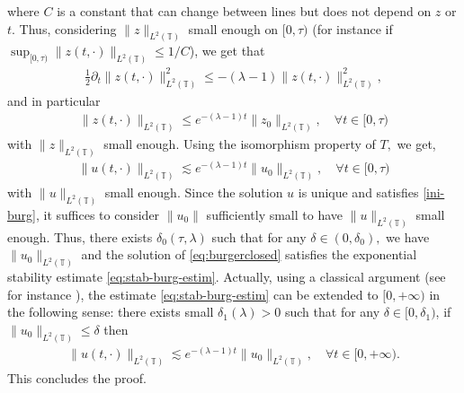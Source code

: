 \documentclass[11pt, dvipsnames]{amsart}
\begin{document}
where $C$ is a constant that can change between lines but does not depend on $z$ or $t$.
Thus, considering $\|z\|_{L^2(\mathbb{T})}$ small enough on $[0,\tau)$ (for instance if $\sup_{[0,\tau)}\|z(t,\cdot)\|_{L^2(\mathbb{T})}\leq 1/C$), we get that
\begin{align*}
 \frac{1}{2}\partial_t \|z(t,\cdot)\|^2_{L^2(\mathbb{T})} \leq -(\lambda-1)\|z(t,\cdot)\|^2_{L^2(\mathbb{T})}, 
\end{align*} and in particular
\begin{align*}
    \|z(t,\cdot)\|_{L^2(\mathbb{T})} \leq e^{-(\lambda-1)t}\|z_0\|_{L^2(\mathbb{T})}, \quad \forall t\in [0,\tau)
\end{align*} with $\|z\|_{L^2(\mathbb{T})}$ small enough. Using the isomorphism property of $T,$ we get,
\begin{align}
    \|u(t,\cdot)\|_{L^2(\mathbb{T})} \lesssim e^{-(\lambda-1)t}\|u_0\|_{L^2(\mathbb{T})}, \quad \forall t\in [0,\tau)\label{eq:stab-burg-estim}
\end{align} with $\|u\|_{L^2(\mathbb{T})}$ small enough. Since the solution $u$ is unique and satisfies \eqref{ini-burg}, it suffices to consider $\|u_0\|$ sufficiently small to have $\|u\|_{L^2(\mathbb{T})}$ small enough. Thus, there exists $\delta_0(\tau,\lambda)$ such that for any $\delta\in (0,\delta_0),$ we have $\|u_0\|_{L^2(\mathbb{T})}$ and the solution of \eqref{eq:burgerclosed} satisfies the exponential stability estimate \eqref{eq:stab-burg-estim}. Actually, using a classical argument (see for instance \cite[Section 6.2]{Gagnon2022-fredholm-laplacien}),  the estimate \eqref{eq:stab-burg-estim} can be extended to $[0,+\infty)$ in the following sense: there exists small $\delta_{1}(\lambda)>0$ such that for any $\delta\in[0,\delta_{1})$, if $\|u_0\|_{L^2(\mathbb{T})}\leq \delta$ then
\begin{align*}
    \|u(t,\cdot)\|_{L^2(\mathbb{T})} \lesssim e^{-(\lambda-1)t}\|u_0\|_{L^2(\mathbb{T})}, \quad \forall t\in [0,+\infty).
\end{align*} This concludes the proof.





\end{document}
